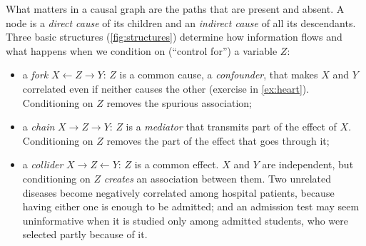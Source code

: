 What matters in a causal graph are the paths that are present and absent. A node is a \emph{direct
cause} of its children and an \emph{indirect cause} of all its descendants. Three basic structures
(\cref{fig:structures}) determine how information flows and what happens when we condition on
(``control for'') a variable $Z$:
\begin{itemize}
  \item a \emph{fork} $X\leftarrow Z\rightarrow Y$: $Z$ is a common cause, a \emph{confounder},
        that makes $X$ and $Y$ correlated even if neither causes the other (exercise in
        \cref{ex:heart}). Conditioning on $Z$ removes the spurious association;
  \item a \emph{chain} $X\rightarrow Z\rightarrow Y$: $Z$ is a \emph{mediator} that transmits part
        of the effect of $X$. Conditioning on $Z$ removes the part of the effect that goes through
        it;
  \item a \emph{collider} $X\rightarrow Z\leftarrow Y$: $Z$ is a common effect. $X$ and $Y$ are
        independent, but conditioning on $Z$ \emph{creates} an association between them. Two
        unrelated diseases become negatively correlated among hospital patients, because having
        either one is enough to be admitted; and an admission test may seem uninformative when it
        is studied only among admitted students, who were selected partly because of it.
\end{itemize}

